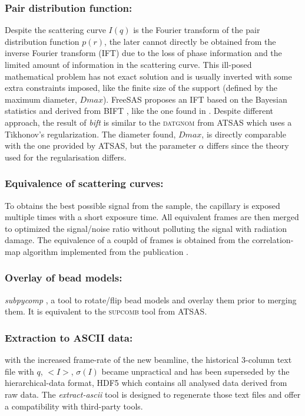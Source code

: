 \documentclass[preprint]{iucr}              %
\begin{document}
\subsubsection{Pair distribution function:}
Despite the scattering curve $I(q)$ is the Fourier transform of the pair distribution function $p(r)$, the later cannot directly be obtained from the
inverse Fourier transform (IFT) due to the loss of phase information and the limited amount of information in the scattering curve. 
This ill-posed mathematical problem has not exact solution and is usually inverted with some extra constraints imposed, like the finite size of the support (defined by the maximum diameter, $Dmax$).    
FreeSAS proposes an IFT based on the Bayesian statistics and derived from BIFT \cite{bift}, like the one found in \cite{bioxtasraw}.
Despite different approach, the result of \textit{bift} is similar to the \textsc{datgnom} \cite{ATSAS1} from ATSAS which uses a Tikhonov's regularization.
The diameter found, $Dmax$, is directly comparable with the one provided by ATSAS, but the parameter $\alpha$ differs since the theory used for the regularisation differs. 

\subsubsection{Equivalence of scattering curves: }
To obtains the best possible signal from the sample, the capillary is exposed multiple times with a short exposure time.
All equivalent frames are then merged to optimized the signal/noise ratio without polluting the signal with radiation damage.  
The equivalence of a coupld of frames is obtained from the correlation-map algorithm implemented from the publication .

\subsubsection{Overlay of bead models:}
\textit{subpycomp} \cite{BM29ODA}, a tool to rotate/flip bead models and overlay them prior to merging them. It is equivalent to the \textsc{supcomb} \cite{supcomb} tool from ATSAS. 

\subsubsection{Extraction to ASCII data:} with the increased frame-rate of the new beamline, the historical 3-column text file with $q$, $<I>$, $\sigma(I)$ became unpractical and has been superseded by the hierarchical-data format, HDF5 \cite{hdf5} which contains all analysed data derived from raw data.
The \textit{extract-ascii} tool is designed to regenerate those text files and offer a compatibility with third-party tools.
\end{document}
